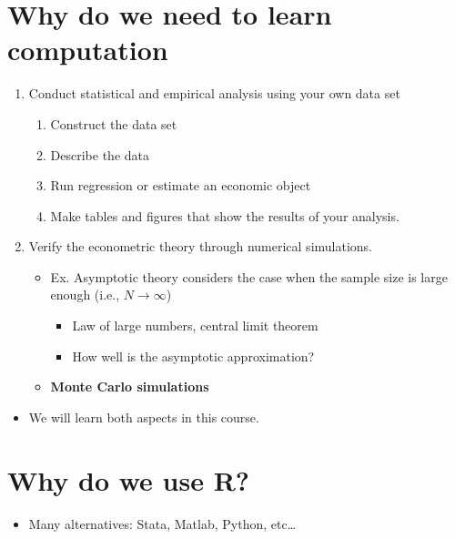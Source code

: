 \documentclass[]{book}
\providecommand{\tightlist}{%
  \setlength{\itemsep}{0pt}\setlength{\parskip}{0pt}}
\begin{document}
\section{Why do we need to learn
computation}\label{why-do-we-need-to-learn-computation}

\begin{enumerate}
\def\labelenumi{\arabic{enumi}.}
\tightlist
\item
  Conduct statistical and empirical analysis using your own data set

  \begin{enumerate}
  \def\labelenumii{\arabic{enumii}.}
  \tightlist
  \item
    Construct the data set
  \item
    Describe the data
  \item
    Run regression or estimate an economic object
  \item
    Make tables and figures that show the results of your analysis.
  \end{enumerate}
\item
  Verify the econometric theory through numerical simulations.

  \begin{itemize}
  \tightlist
  \item
    Ex. Asymptotic theory considers the case when the sample size is
    large enough (i.e., \(N \rightarrow \infty\))

    \begin{itemize}
    \tightlist
    \item
      Law of large numbers, central limit theorem
    \item
      How well is the asymptotic approximation?
    \end{itemize}
  \item
    \textbf{Monte Carlo simulations}
  \end{itemize}
\end{enumerate}

\begin{itemize}
\tightlist
\item
  We will learn both aspects in this course.
\end{itemize}

\section{Why do we use R?}\label{why-do-we-use-r}

\begin{itemize}
\tightlist
\item
  Many alternatives: Stata, Matlab, Python, etc\ldots{}
\end{itemize}
\end{document}
